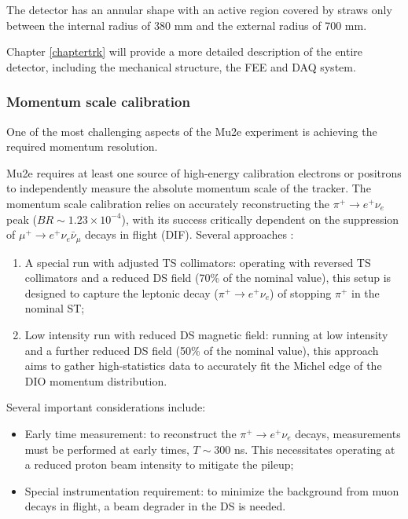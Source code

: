 The detector has an annular shape with an active region covered by straws only between the 
internal radius of 380 mm and the external radius of 700 mm.  

Chapter \ref{chaptertrk} will provide a more detailed description of the entire detector, 
including the mechanical structure, the FEE and 
DAQ system.
\subsubsection{Momentum scale calibration}
One of the most challenging aspects of the Mu2e experiment is achieving the 
required momentum resolution.


Mu2e requires at least one source of high-energy calibration electrons or 
positrons to independently measure the absolute momentum scale of the tracker. 
The momentum scale calibration relies on accurately reconstructing the 
$\pi^+ \rightarrow e^+ \nu_e$ peak ($BR\sim 1.23 \times 10^{-4}$), with its success critically dependent on the 
suppression of $\mu^+ \rightarrow e^+ \nu_e \bar{\nu}_\mu$ decays in flight (DIF). 
Several approaches 
:

\begin{enumerate}
    \item A special run with adjusted TS collimators: operating with 
    reversed TS collimators and a reduced DS field 
    (70\% of the nominal value), this setup is designed to capture the 
    leptonic decay ($\pi^+ \rightarrow e^+ \nu_e$) of stopping $\pi^+$ in the nominal ST;
    
    \item Low intensity run with reduced DS magnetic field: 
    running at low intensity and a further reduced DS field 
    (50\% of the nominal value), 
    this approach aims to gather high-statistics data to accurately fit 
    the Michel edge of the DIO momentum distribution.
\end{enumerate}

Several important considerations include:

\begin{itemize}
    \item Early time measurement: to reconstruct the $\pi^+ \rightarrow e^+ \nu_e$ decays, 
    measurements must be performed at early times,  
    $T \sim 300$ ns. This necessitates operating at a reduced proton 
    beam intensity to mitigate the pileup;
    
    \item Special instrumentation requirement: to minimize 
      the background from muon decays in flight, a beam degrader
      in the DS is needed.
\end{itemize}

